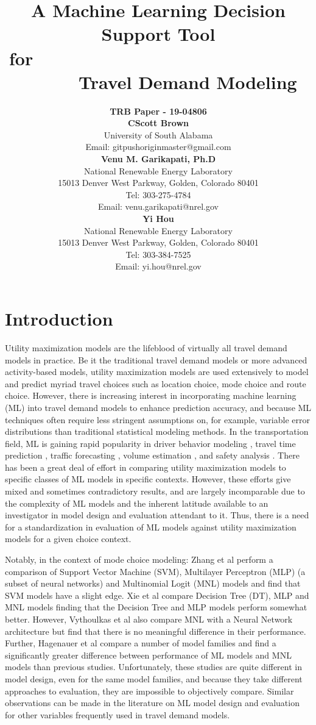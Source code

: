 \documentclass[numbered]{trbunofficial}
\title{A Machine Learning Decision Support Tool for\ \ \ \ \ \ \ \ \ \ \ \ \ \ \ \ \ \ \ \ \ \ \ \ \ \ \ \ \ \ \ \ \ \  Travel Demand Modeling}
\author{%
  \textbf{TRB Paper - 19-04806}\\
  \hfill\break%
  \hfill\break%
  \textbf{CScott Brown}\\
University of South Alabama\\
Email: gitpushoriginmaster@gmail.com\\
  \hfill\break%
  \textbf{Venu M. Garikapati, Ph.D}\\
National Renewable Energy Laboratory\\
15013 Denver West Parkway, Golden, Colorado 80401\\
Tel: 303-275-4784\\
Email: venu.garikapati@nrel.gov\\
  \hfill\break%
  \textbf{Yi Hou}\\
National Renewable Energy Laboratory\\
15013 Denver West Parkway, Golden, Colorado 80401\\
Tel: 303-384-7525\\
Email: yi.hou@nrel.gov \\
}
\begin{document}
\maketitle

\section{Introduction} \label{section:introduction}

Utility maximization models are the lifeblood of virtually all travel demand models in practice. 
 Be it the traditional travel demand models or more advanced activity-based models, utility maximization models are used extensively to model and predict myriad travel choices such as location choice, mode choice and route choice. 
 However, there is increasing interest in incorporating machine learning (ML) into travel demand models to enhance prediction accuracy, and because ML techniques often require less stringent assumptions on, for example, variable error distributions than traditional statistical modeling methods.
 In the transportation field, ML is gaining rapid popularity in driver behavior modeling , travel time prediction , traffic forecasting , volume estimation , and safety analysis . 
 There has been a great deal of effort in comparing utility maximization models to specific classes of ML models in specific contexts.
 However, these efforts give mixed and sometimes contradictory results, and are largely incomparable due to the complexity of ML models and the inherent latitude available to an investigator in model design and evaluation attendant to it.
 Thus, there is a need for a standardization in evaluation of ML models against utility maximization models for a given choice context. 
 
Notably, in the context of mode choice modeling: 
 Zhang et al  perform a comparison of Support Vector Machine (SVM), Multilayer Perceptron (MLP) (a subset of neural networks) and Multinomial Logit (MNL) models and find that SVM models have a slight edge. 
 Xie et al  compare Decision Tree (DT), MLP and MNL models finding that the Decision Tree and MLP models perform somewhat better.
 However, Vythoulkas et al  also compare MNL with a Neural Network architecture but find that there is no meaningful difference in their performance.
 Further, Hagenauer et al  compare a number of model families and find a significantly greater difference between performance of ML models and MNL models than previous studies.
 Unfortunately, these studies are quite different in model design, even for the same model families, and because they take different approaches to evaluation, they are impossible to objectively compare.
 Similar observations can be made in the literature on ML model design and evaluation for other variables frequently used in travel demand models.
\end{document}
